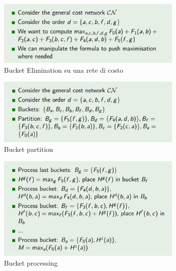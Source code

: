 \documentclass[11pt,oneside]{book}
\begin{document}
\begin{figure}[htp]
	\begin{subfigure}{0.49\textwidth}
	    \centering
		\includegraphics[width=\textwidth, height=\textheight, keepaspectratio]{dp-example1.png} 
		\caption{Bucket Elimination su una rete di costo}
	\end{subfigure}
	\hfill
	\begin{subfigure}{0.49\textwidth}
	    \centering
		\includegraphics[width=\textwidth, height=\textheight, keepaspectratio]{dp-example2.png} 
		\caption{Bucket partition}
	\end{subfigure}
	\begin{subfigure}{0.49\textwidth}
	    \centering
		\includegraphics[width=\textwidth, height=\textheight, keepaspectratio]{dp-example3.png}
		\caption{Bucket processing}
	\end{subfigure}
	\hfill
	\begin{subfigure}{0.49\textwidth}

\end{subfigure}
\end{figure}
\end{document}
